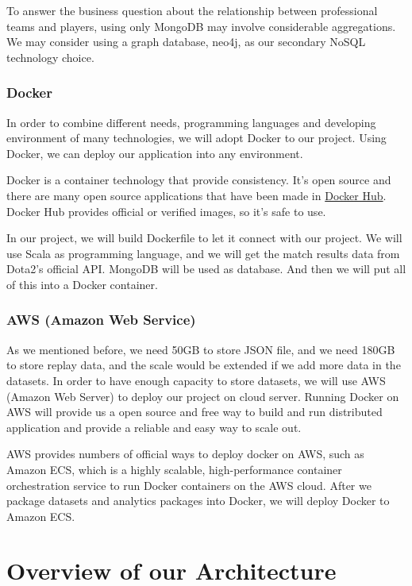 \documentclass{article}
\begin{document}
To answer the business question about the relationship between professional teams and players, using only MongoDB may involve considerable aggregations. We may consider using a graph database, neo4j, as our secondary NoSQL technology choice.

\subsubsection{Docker}

In order to combine different needs, programming languages and developing environment of many technologies, we will adopt Docker to our project.
Using Docker, we can deploy our application into any environment.

Docker is a container technology that provide consistency.
It's open source and there are many open source applications that have been made in \href{https://hub.docker.com}{Docker Hub}.
Docker Hub provides official or verified images, so it's safe to use.

In our project, we will build Dockerfile to let it connect with our project.
We will use Scala as programming language, and we will get the match results data from Dota2's official API.
MongoDB will be used as database. And then we will put all of this into a Docker container.

\subsubsection{AWS (Amazon Web Service)}

As we mentioned before, we need 50GB to store JSON file, and we need 180GB to store replay data, and the scale would be extended if we add more data in the datasets.
In order to have enough capacity to store datasets, we will use AWS (Amazon Web Server) to deploy our project on cloud server.
Running Docker on AWS will provide us a open source and free way to build and run distributed application and provide a reliable and easy way to scale out.

AWS provides numbers of official ways to deploy docker on AWS, such as Amazon ECS, which is a highly scalable, high-performance container orchestration service to run Docker containers on the AWS cloud.
After we package datasets and analytics packages into Docker, we will deploy Docker to Amazon ECS.


\section{Overview of our Architecture}
\end{document}

